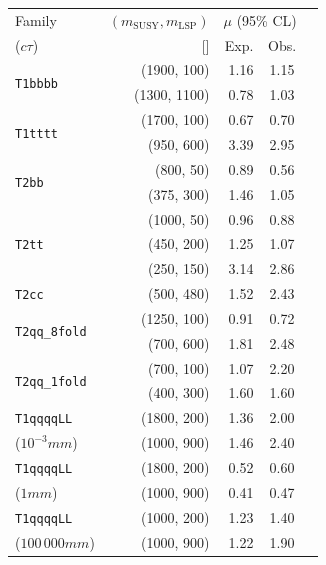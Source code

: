 \clearpage
\begin{table}
  \label{tab:benchmarks_aux}
  \centering
    \begin{tabular}{ lrrcc }
      \hline
      Family
      & $(m_{\text{SUSY}}, m_{\mathrm{LSP}})$
      & \multicolumn{2}{c}{$\mu$ (95\% CL)}                                                                            \\ [0.3ex]
      ($c\tau$)
      & [\GeVns{}]
      & Exp.
      & Obs.                                                                                                           \\ [0.3ex]
      \hline
      \multirow{2}{*}{\texttt{T1bbbb}}
& (1900, 100) 
& 1.16 & 1.15 \\
& (1300, 1100)
& 0.78 & 1.03 \\ [0.5ex]
      \multirow{2}{*}{\texttt{T1tttt}}
& (1700, 100) 
& 0.67 & 0.70 \\
& (950, 600)  
& 3.39 & 2.95 \\ [0.5ex]
      \multirow{2}{*}{\texttt{T2bb}}
& (800, 50)
& 0.89 & 0.56 \\
& (375, 300)
& 1.46 & 1.05 \\ [0.5ex]
      \multirow{3}{*}{\texttt{T2tt}}
& (1000, 50)  
& 0.96 & 0.88 \\
& (450, 200)  
& 1.25 & 1.07 \\ 
& (250, 150)  
& 3.14 & 2.86 \\ [0.5ex]
      \multirow{1}{*}{\texttt{T2cc}}
& (500, 480)  
& 1.52 & 2.43 \\ [0.5ex]
      \multirow{2}{*}{\texttt{T2qq\_8fold}}
& (1250, 100) 
& 0.91 & 0.72 \\
& (700, 600)  
& 1.81 & 2.48 \\ [0.5ex]
      \multirow{2}{*}{\texttt{T2qq\_1fold}}
& (700, 100)  
& 1.07 & 2.20 \\
& (400, 300)  
& 1.60 & 1.60 \\ [0.5ex]
      \texttt{T1qqqqLL}
& (1800, 200)
& 1.36 & 2.00 \\
     ($10^{-3}\unit{mm}$)
& (1000, 900)
& 1.46 & 2.40 \\ [0.5ex]
      \texttt{T1qqqqLL}
& (1800, 200)
& 0.52 & 0.60 \\
     ($1\unit{mm}$)
& (1000, 900)
& 0.41 & 0.47 \\ [0.5ex]
      \texttt{T1qqqqLL}
& (1000, 200)
& 1.23 & 1.40 \\
     ($100\,000\unit{mm}$)
& (1000, 900)
& 1.22 & 1.90 \\
      \hline
    \end{tabular}
\end{table}

